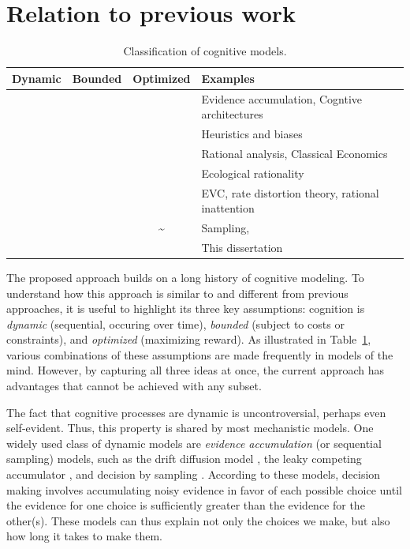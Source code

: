 \section{Relation to previous work}


\newcommand{\yes}{\checkmark &}
\begin{table}[tb]
  \caption{Classification of cognitive models.}
  \label{tab:comparison}
  \centering
  \begin{tabular}{ccc|p{\dimexpr\textwidth - 7cm}}
  \toprule
  Dynamic & Bounded & Optimized & Examples \\
  \midrule
  \yes & &
    Evidence accumulation, Cogntive architectures
  \\ & \yes & 
    Heuristics and biases
  \\ & & \yes
    Rational analysis, Classical Economics
  \\ \yes \yes &
    Ecological rationality
  \\ & \yes \yes 
    EVC, rate distortion theory, rational inattention
  \\ \yes \yes \textasciitilde &
    Sampling, 
  \\ \yes \yes \yes
    This dissertation 
  \\ \bottomrule
  \end{tabular}
\end{table}


The proposed approach builds on a long history of cognitive modeling. To understand how this approach is similar to and different from previous approaches, it is useful to highlight its three key assumptions: cognition is \emph{dynamic} (sequential, occuring over time), \emph{bounded} (subject to costs or constraints), and \emph{optimized} (maximizing reward). As illustrated in Table~\ref{tab:comparison}, various combinations of these assumptions are made frequently in models of the mind. However, by capturing all three ideas at once, the current approach has advantages that cannot be achieved with any subset.

The fact that cognitive processes are dynamic is uncontroversial, perhaps even self-evident. Thus, this property is shared by most mechanistic models. One widely used class of dynamic models are \emph{evidence accumulation} (or sequential sampling) models, such as the drift diffusion model \citep{ratcliff1978theory}, the leaky competing accumulator \citep{usher2001time}, and decision by sampling \citep{stewart2006decision}. According to these models, decision making involves accumulating noisy evidence in favor of each possible choice until the evidence for one choice is sufficiently greater than the evidence for the other(s). These models can thus explain not only the choices we make, but also how long it takes to make them.

